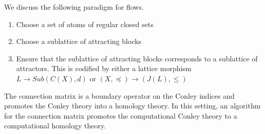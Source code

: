 
We discuss the following paradigm for flows. 

\begin{enumerate}
\item Choose a set of atoms of regular closed sets

\item Choose a sublattice of attracting blocks

\item Ensure that the sublattice of attracting blocks corresponds to a sublattice of attractors.  This is codified by either a lattice morphism $L\to Sub(C(X),d)$ or $(X,\preceq)\to (J(L),\leq)$

\end{enumerate}






The connection matrix is a boundary operator on the Conley indices and promotes the Conley theory into a homology theory.  In this setting, an algorithm for the connection matrix promotes the computational Conley theory to a computational homology theory.





